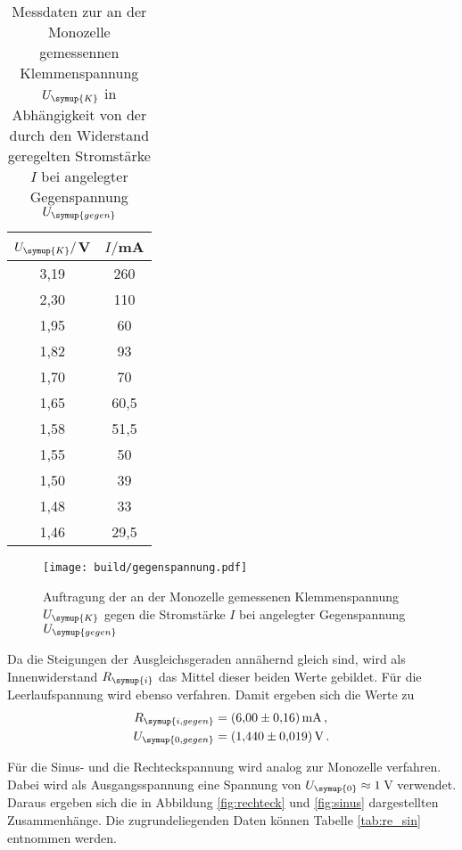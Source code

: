 \begin{table}
  \centering
  \caption{Messdaten zur an der Monozelle gemessennen Klemmenspannung $U_{\symup{K}}$
  in Abhängigkeit von der durch den Widerstand geregelten Stromstärke $I$ bei angelegter
  Gegenspannung $U_{\symup{gegen}}$}
  \label{tab:gegenspannung}
  \begin{tabular}{c c}
    \toprule
    $U_{\symup{K}}/$V & $I/$mA\\
    \midrule
    3,19	&  260\\
    2,30	&  110\\
    1,95	&  60\\
    1,82	&  93\\
    1,70	&  70\\
    1,65	&  60,5\\
    1,58	&  51,5\\
    1,55	&  50\\
    1,50	&  39\\
    1,48	&  33\\
    1,46	&  29,5\\
    \bottomrule
  \end{tabular}
\end{table}

\begin{figure}
  \centering
  \texttt{[image: build/gegenspannung.pdf]}
  \caption{Auftragung der an der Monozelle gemessenen Klemmenspannung $U_{\symup{K}}$
  gegen die Stromstärke $I$ bei angelegter Gegenspannung $U_{\symup{gegen}}$ }
  \label{fig:gegenspannung}
\end{figure}

Da die Steigungen der Ausgleichsgeraden annähernd gleich sind, wird als Innenwiderstand $R_{\symup{i}}$
das Mittel dieser beiden Werte gebildet. Für die Leerlaufspannung wird ebenso verfahren.
Damit ergeben sich die Werte zu
\begin{align}
  R_{\symup{i,gegen}} &= \SI{6.00(016)}{\milli\ampere} \,,\\
  U_{\symup{0,gegen}} &= \SI{1.440(0019)}{\volt} \,.
\end{align}

Für die Sinus- und die Rechteckspannung wird analog zur Monozelle verfahren. Dabei
wird als Ausgangsspannung eine Spannung von $U_{\symup{0}}\approx1$\,V verwendet.
Daraus ergeben sich die in Abbildung \ref{fig:rechteck} und \ref{fig:sinus} dargestellten
Zusammenhänge. Die zugrundeliegenden Daten können Tabelle \ref{tab:re_sin} entnommen
werden.

